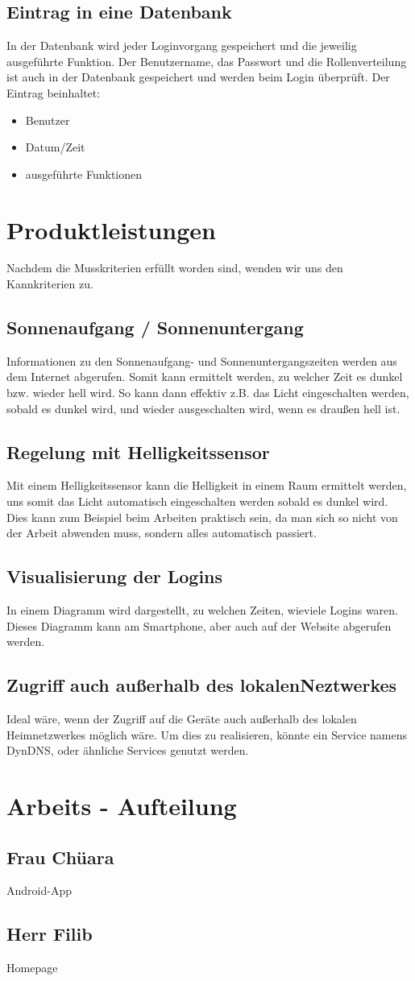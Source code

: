 \documentclass[10pt,a4paper]{report}
\begin{document}
\subsection{Eintrag in eine Datenbank}
In der Datenbank wird jeder Loginvorgang gespeichert und die jeweilig ausgeführte Funktion. 
Der Benutzername, das Passwort und die Rollenverteilung ist auch in der Datenbank gespeichert und werden beim Login überprüft.
Der Eintrag beinhaltet:
\begin{itemize}
\item Benutzer
\item Datum/Zeit
\item ausgeführte Funktionen
\end{itemize}

\section{Produktleistungen}
Nachdem die Musskriterien erfüllt worden sind, wenden wir uns den Kannkriterien zu.

\subsection{Sonnenaufgang / Sonnenuntergang}
Informationen zu den Sonnenaufgang- und Sonnenuntergangszeiten werden aus dem Internet abgerufen. Somit kann ermittelt werden, zu welcher Zeit es dunkel bzw. wieder hell wird. So kann dann effektiv z.B. das Licht eingeschalten werden, sobald es dunkel wird, und wieder ausgeschalten wird, wenn es draußen hell ist.

\subsection{Regelung mit Helligkeitssensor}
Mit einem Helligkeitssensor kann die Helligkeit in einem Raum ermittelt werden, uns somit das Licht automatisch eingeschalten werden sobald es dunkel wird. Dies kann zum Beispiel beim Arbeiten praktisch sein, da man sich so nicht von der Arbeit abwenden muss, sondern alles automatisch passiert.

\subsection{Visualisierung der Logins}
In einem Diagramm wird dargestellt, zu welchen Zeiten, wieviele Logins waren. Dieses Diagramm kann am Smartphone, aber auch auf der Website abgerufen werden.

\subsection{Zugriff auch außerhalb des lokalenNeztwerkes}
Ideal wäre, wenn der Zugriff auf die Geräte auch außerhalb des lokalen Heimnetzwerkes möglich wäre. Um dies zu realisieren, könnte ein Service namens DynDNS, oder ähnliche Services genutzt werden. 


\section{Arbeits - Aufteilung}
\subsection{Frau Chüara}
Android-App
\subsection{Herr Filib}
Homepage
\end{document}
